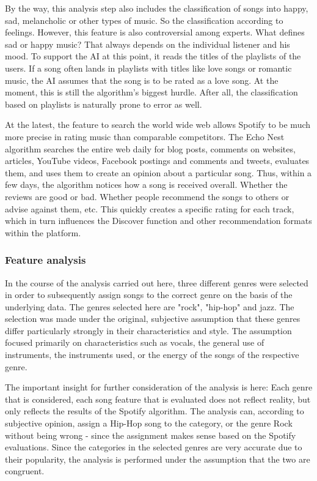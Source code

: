 By the way, this analysis step also includes the classification of songs into happy, sad,
melancholic or other types of music. 
So the classification according to feelings.
However, this feature is also controversial among experts. What defines sad or happy music? 
That always depends on the individual listener and his mood. To support the AI at this point,
it reads the titles of the playlists of the users. 
If a song often lands in playlists with titles like love songs or romantic music,
the AI assumes that the song is to be rated as a love song. 
At the moment, this is still the algorithm's biggest hurdle.
After all, the classification based on playlists is naturally prone to error as well.  

At the latest, the feature to search the world wide web allows Spotify to be much more
precise in rating music than comparable competitors. 
The Echo Nest algorithm searches the entire web daily for blog posts, comments on websites,
articles, YouTube videos, Facebook postings and comments and tweets, 
evaluates them, and uses them to create an opinion about a particular song.
Thus, within a few days, the algorithm notices how a song is received overall. 
Whether the reviews are good or bad.
Whether people recommend the songs to others or advise against them, etc. 
This quickly creates a specific rating for each track, which in turn influences the
Discover function and other recommendation formats within the platform. 

\subsubsection{Feature analysis}
In the course of the analysis carried out here, three different genres were selected in order
to subsequently assign songs to the correct genre on the basis of the underlying data. 
The genres selected here are "rock", "hip-hop" and jazz. The selection was made under the original, 
subjective assumption that these genres differ particularly strongly in their characteristics and style. 
The assumption focused primarily on characteristics such as vocals, the general use of instruments,
the instruments used, or the energy of the songs of the respective genre.

The important insight for further consideration of the analysis is here:
Each genre that is considered, each song feature that is evaluated does not reflect reality, 
but only reflects the results of the Spotify algorithm. The analysis can,
according to subjective opinion, assign a Hip-Hop song to the category, 
or the genre Rock without being wrong - since the assignment makes sense based on the Spotify evaluations. 
Since the categories in the selected genres are very accurate due to their popularity,
the analysis is performed under the assumption that the two are congruent. 

